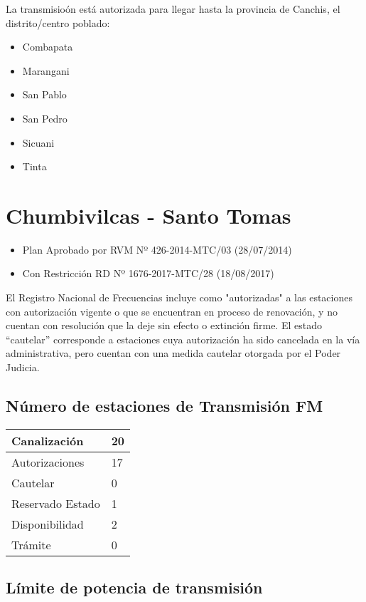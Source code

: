 \documentclass[a4paper]{IEEEtran} %
\begin{document}
La transmisioón está autorizada para llegar hasta la provincia de Canchis, el distrito/centro poblado:

\begin{itemize}
	\item Combapata
	\item Marangani
	\item San Pablo
	\item San Pedro
	\item Sicuani
	\item Tinta
\end{itemize}



\section{Chumbivilcas - Santo Tomas}

\begin{itemize}
	\item Plan Aprobado por RVM Nº 426-2014-MTC/03 (28/07/2014)
	\item Con Restricción RD Nº 1676-2017-MTC/28 (18/08/2017)
\end{itemize}

El Registro Nacional de Frecuencias incluye como "autorizadas" a las estaciones con autorización vigente o que se encuentran en proceso de renovación, y no cuentan con resolución que la deje sin efecto o extinción firme. El estado “cautelar” corresponde a estaciones cuya autorización ha sido cancelada en la vía administrativa, pero cuentan con una medida cautelar otorgada por el Poder Judicia.

\subsection{Número de estaciones de Transmisión FM}

\begin{tabular}{|l|l|} \hline
	Canalización 			& 20 \\ \hline
	Autorizaciones			& 17 \\ \hline
	Cautelar				& 0 \\ \hline
	Reservado Estado		& 1 \\ \hline
	Disponibilidad			& 2 \\ \hline
	Trámite					& 0 \\ \hline 
\end{tabular}

\subsection{Límite de potencia de transmisión}
\end{document}
